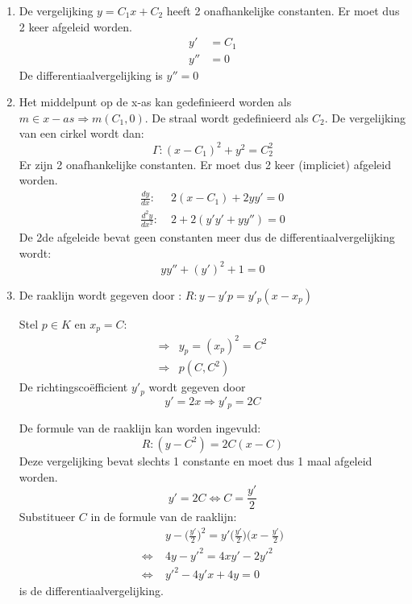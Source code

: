 {
\begin{enumerate}
\item De vergelijking $y = C_1x + C_2$ heeft 2 onafhankelijke constanten. Er moet dus 2 keer afgeleid worden.
\begin{equation*}
\begin{split}
y' & = C_1 \\
y'' & = 0
\end{split}
\end{equation*}
De differentiaalvergelijking is $y'' = 0$
\item Het middelpunt op de x-as kan gedefinieerd worden als $m \in x-as \Rightarrow m(C_1, 0)$. De straal wordt gedefinieerd als $C_2$. De vergelijking van een cirkel wordt dan:
$$\Gamma: (x - C_1)^2 + y^2 = C_2^2$$
Er zijn 2 onafhankelijke constanten. Er moet dus 2 keer (impliciet) afgeleid worden.
\begin{equation*}
\begin{split}
\frac{dy}{dx} :\; & 2(x - C_1) + 2yy' = 0 \\
\frac{d^2y}{dx^2} :\; & 2 + 2(y'y' + yy'') = 0
\end{split}
\end{equation*}
De 2de afgeleide bevat geen constanten meer dus de differentiaalvergelijking wordt: 
$$yy'' + (y')^2 + 1 = 0$$
\item De raaklijn wordt gegeven door : $R: y - y'p = y'_p(x - x_p)$

Stel $p \in K$ en $x_p = C$:
\begin{equation*}
\begin{split}
\Rightarrow & y_p = (x_p)^2 = C^2 \\
\Rightarrow & p(C, C^2)
\end{split}
\end{equation*}
De richtingscoëfficient $y'_p$ wordt gegeven door 
$$y'= 2x \Rightarrow y'_p = 2C$$

De formule van de raaklijn kan worden ingevuld:
$$R: (y - C^2) = 2C(x - C)$$
Deze vergelijking bevat slechts 1 constante en moet dus 1 maal afgeleid worden.
$$y' = 2C \Leftrightarrow C = \frac{y'}{2}$$
Substitueer $C$ in de formule van de raaklijn:
\begin{equation*}
\begin{split}
    & y - \bigg(\frac{y'}{2}\bigg)^2 = y'\bigg(\frac{y'}{2}\bigg)\bigg(x - \frac{y'}{2}\bigg) \\
    \Leftrightarrow \; & 4y - y'^2 = 4xy' - 2y'^2 \\
    \Leftrightarrow \; & y'^2 - 4y'x + 4y = 0
\end{split}
\end{equation*}
is de differentiaalvergelijking.
\end{enumerate}
}



